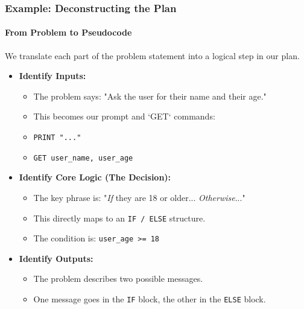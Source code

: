\documentclass{beamer}
\begin{document}
\begin{frame}
    \frametitle{Example: Deconstructing the Plan}
    \framesubtitle{From Problem to Pseudocode}

    We translate each part of the problem statement into a logical step in our plan.

    \begin{itemize}
        \item<1-> \textbf{Identify Inputs:}
        \begin{itemize}
            \item The problem says: "Ask the user for their name and their age."
            \item This becomes our prompt and `GET` commands:
            \item[] \texttt{PRINT "..."}
            \item[] \texttt{GET user\_name, user\_age}
        \end{itemize}
        \vspace{1em}
        \item<2-> \textbf{Identify Core Logic (The Decision):}
        \begin{itemize}
            \item The key phrase is: "\textit{If} they are 18 or older... \textit{Otherwise}..."
            \item This directly maps to an \texttt{IF / ELSE} structure.
            \item The condition is: \texttt{user\_age >= 18}
        \end{itemize}
        \vspace{1em}
        \item<3-> \textbf{Identify Outputs:}
        \begin{itemize}
            \item The problem describes two possible messages.
            \item One message goes in the \texttt{IF} block, the other in the \texttt{ELSE} block.
        \end{itemize}
    \end{itemize}
\end{frame}
\end{document}

